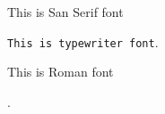 \documentclass[12pt]{article}
\begin{document}
\textsf{This is San Serif font}

\texttt{This is typewriter font}.

\textrm{This is Roman font}

.
\end{document}
